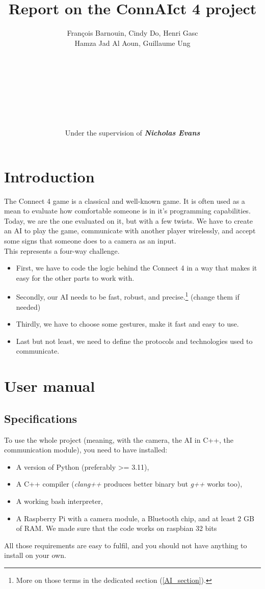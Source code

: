 \documentclass[12pt, a4paper, oneside]{report}
\title{\textbf{Report on the ConnAIct 4 project}}
\author{\normalsize François Barnouin, Cindy Do, Henri Gasc\\\normalsize Hamza Jad Al Aoun, Guillaume Ung\\\\\\\\\\\\\\\\\\Under the supervision of \textbf{\textit{Nicholas Evans}}}
\date{}
\begin{document}
	\maketitle
	\tableofcontents

	\chapter{Introduction}
	The Connect 4 game is a classical and well-known game. It is often used as a mean to evaluate how comfortable someone is in it's programming capabilities. \\
	Today, we are the one evaluated on it, but with a few twists. We have to create an AI to play the game, communicate with another player wirelessly, and accept some signs that someone does to a camera as an input. \\
	This represents a four-way challenge.
	\begin{itemize}
		\item First, we have to code the logic behind the Connect 4 in a way that makes it easy for the other parts to work with.
		\item Secondly, our AI needs to be fast, robust, and precise.\footnote{More on those terms in the dedicated section (\ref{AI_section}).} (change them if needed)
		\item Thirdly, we have to choose some gestures, make it fast and easy to use.
		\item Last but not least, we need to define the protocols and technologies used to communicate.
	\end{itemize}

	\chapter{User manual}

	\section{Specifications}
	To use the whole project (meaning, with the camera, the AI in C++, the communication module), you need to have installed:
	\begin{itemize}
		\item A version of Python (preferably >= 3.11),
		\item A C++ compiler (\textit{clang++} produces better binary but \textit{g++} works too),
		\item A working bash interpreter,
		\item A Raspberry Pi with a camera module, a Bluetooth chip, and at least 2 GB of RAM. We made sure that the code works on raspbian 32 bits
	\end{itemize}
	All those requirements are easy to fulfil, and you should not have anything to install on your own. \\
\end{document}

